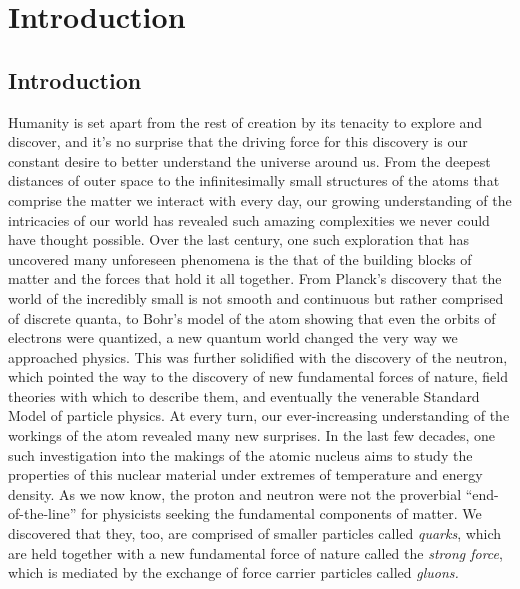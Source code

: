 \chapter{Introduction}


\section{Introduction}
Humanity is set apart from the rest of creation by its tenacity to explore and discover, and it's no surprise that the driving force for this discovery is our constant desire to better understand the universe around us. From the deepest distances of outer space to the infinitesimally small structures of the atoms that comprise the matter we interact with every day, our growing understanding of the intricacies of our world has revealed such amazing complexities we never could have thought possible. Over the last century, one such exploration that has uncovered many unforeseen phenomena is the that of the building blocks of matter and the forces that hold it all together. From Planck's discovery that the world of the incredibly small is not smooth and continuous but rather comprised of discrete quanta, to Bohr's model of the atom showing that even the orbits of electrons were quantized, a new quantum world changed the very way we approached physics. This was further solidified with the discovery of the neutron, which pointed the way to the discovery of new fundamental forces of nature, field theories with which to describe them, and eventually the venerable Standard Model of particle physics. At every turn, our ever-increasing understanding of the workings of the atom revealed many new surprises. In the last few decades, one such investigation into the makings of the atomic nucleus aims to study the properties of this nuclear material under extremes of temperature and energy density. As we now know, the proton and neutron were not the proverbial 
``end-of-the-line'' for physicists seeking the fundamental components of matter. We discovered that they, too, are comprised of smaller particles called \textit{quarks}, which are held together with a new fundamental force of nature called the \textit{strong force}, which is mediated by the exchange of force carrier particles called \textit{gluons.} 

